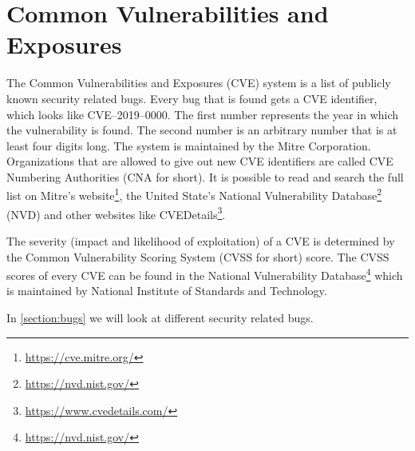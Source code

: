 \section{Common Vulnerabilities and Exposures}
The Common Vulnerabilities and Exposures (CVE) system is a list of publicly known security related bugs. Every bug that is found gets a CVE identifier, which looks like CVE--2019--0000. The first number represents the year in which the vulnerability is found. The second number is an arbitrary number that is at least four digits long. The system is maintained by the Mitre Corporation. Organizations that are allowed to give out new CVE identifiers are called CVE Numbering Authorities (CNA for short). It is possible to read and search the full list on Mitre's website\footnote{\url{https://cve.mitre.org/}}, the United State's National Vulnerability Database\footnote{\url{https://nvd.nist.gov/}} (NVD) and other websites like CVEDetails\footnote{\url{https://www.cvedetails.com/}}.

The severity (impact and likelihood of exploitation) of a CVE is determined by the Common Vulnerability Scoring System (CVSS for short) score. The CVSS scores of every CVE can be found in the National Vulnerability Database\footnote{\url{https://nvd.nist.gov/}} which is maintained by National Institute of Standards and Technology.

\medskip

In \autoref{section:bugs} we will look at different security related bugs.
